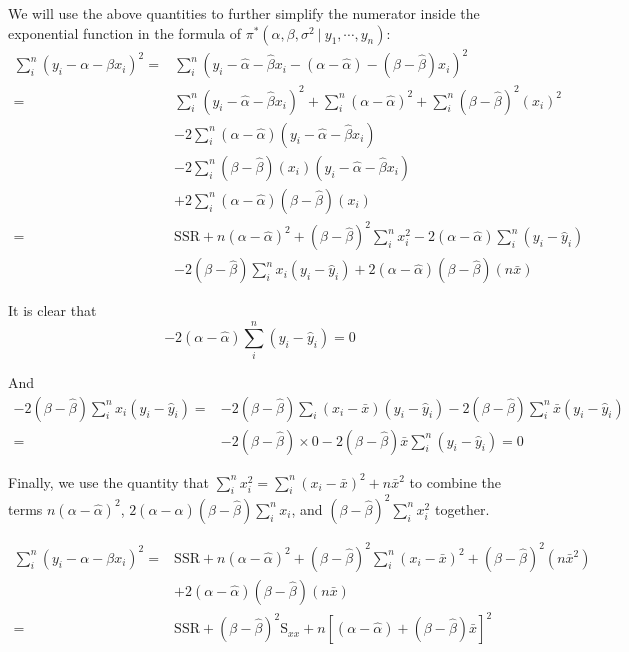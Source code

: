 \documentclass[]{book}
\theoremstyle{definition}
\theoremstyle{definition}
\theoremstyle{definition}
\theoremstyle{remark}
\begin{document}
We will use the above quantities to further simplify the numerator
inside the exponential function in the formula of
\(\pi^*(\alpha, \beta, \sigma^2~|~y_1,\cdots,y_n)\): \[ 
\begin{aligned}
\sum_i^n \left(y_i - \alpha - \beta x_i\right)^2 = & \sum_i^n \left(y_i - \hat{\alpha} - \hat{\beta}x_i - (\alpha - \hat{\alpha}) - (\beta - \hat{\beta})x_i\right)^2 \\
= & \sum_i^n \left(y_i - \hat{\alpha} - \hat{\beta}x_i\right)^2 + \sum_i^n (\alpha - \hat{\alpha})^2 + \sum_i^n (\beta-\hat{\beta})^2(x_i)^2 \\
  & - 2\sum_i^n (\alpha - \hat{\alpha})(y_i-\hat{\alpha}-\hat{\beta}x_i)\\
  & - 2\sum_i^n (\beta-\hat{\beta})(x_i)(y_i-\hat{\alpha}-\hat{\beta}x_i)\\
  & + 2\sum_i^n(\alpha - \hat{\alpha})(\beta-\hat{\beta})(x_i)\\
= & \text{SSR} + n(\alpha-\hat{\alpha})^2 + (\beta-\hat{\beta})^2\sum_i^n x_i^2 - 2(\alpha-\hat{\alpha})\sum_i^n (y_i-\hat{y}_i) \\
  & -2(\beta-\hat{\beta})\sum_i^n x_i(y_i-\hat{y}_i)+2(\alpha-\hat{\alpha})(\beta-\hat{\beta})(n\bar{x})
\end{aligned}
\]

It is clear that
\[ -2(\alpha-\hat{\alpha})\sum_i^n(y_i-\hat{y}_i) = 0 \]

And \[
\begin{aligned}
-2(\beta-\hat{\beta})\sum_i^n x_i(y_i-\hat{y}_i) = & -2(\beta-\hat{\beta})\sum_i(x_i-\bar{x})(y_i-\hat{y}_i) - 2(\beta-\hat{\beta})\sum_i^n \bar{x}(y_i-\hat{y}_i) \\
= & -2(\beta-\hat{\beta})\times 0 - 2(\beta-\hat{\beta})\bar{x}\sum_i^n(y_i-\hat{y}_i) = 0
\end{aligned}
\]

Finally, we use the quantity that
\(\displaystyle \sum_i^n x_i^2 = \sum_i^n(x_i-\bar{x})^2+ n\bar{x}^2\)
to combine the terms \(n(\alpha-\hat{\alpha})^2\),
\(2\displaystyle (\alpha-\hat{\alpha})(\beta-\hat{\beta})\sum_i^n x_i\),
and \(\displaystyle (\beta-\hat{\beta})^2\sum_i^n x_i^2\) together.

\[
\begin{aligned}
\sum_i^n (y_i-\alpha-\beta x_i)^2 = & \text{SSR} + n(\alpha-\hat{\alpha})^2 +(\beta-\hat{\beta})^2\sum_i^n (x_i-\bar{x})^2 + (\beta-\hat{\beta})^2 (n\bar{x}^2) \\
& +2(\alpha-\hat{\alpha})(\beta-\hat{\beta})(n\bar{x})\\
= & \text{SSR} + (\beta-\hat{\beta})^2\text{S}_{xx} + n\left[(\alpha-\hat{\alpha}) +(\beta-\hat{\beta})\bar{x}\right]^2
\end{aligned}
\]
\end{document}
